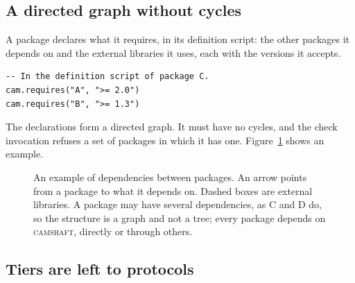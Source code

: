 \documentclass[11pt,a4paper]{article}
\newcommand{\camshaft}{\textsc{camshaft}}
\begin{document}
\subsection{A directed graph without cycles}

A package declares what it requires, in its definition script: the other
packages it depends on and the external libraries it uses, each with the
versions it accepts.

\begin{lstlisting}[language={[5.3]Lua}]
-- In the definition script of package C.
cam.requires("A", ">= 2.0")
cam.requires("B", ">= 1.3")
\end{lstlisting}

The declarations form a directed graph.  It must have no cycles, and the
check invocation refuses a set of packages in which it has one.
Figure~\ref{fig:packages} shows an example.

\begin{figure}[ht]
\centering
{}
\caption{An example of dependencies between packages.  An arrow points from
a package to what it depends on.  Dashed boxes are external libraries.  A
package may have several dependencies, as C and D do, so the structure is a
graph and not a tree; every package depends on \camshaft{}, directly or
through others.}
\label{fig:packages}
\end{figure}

\subsection{Tiers are left to protocols}
\end{document}
